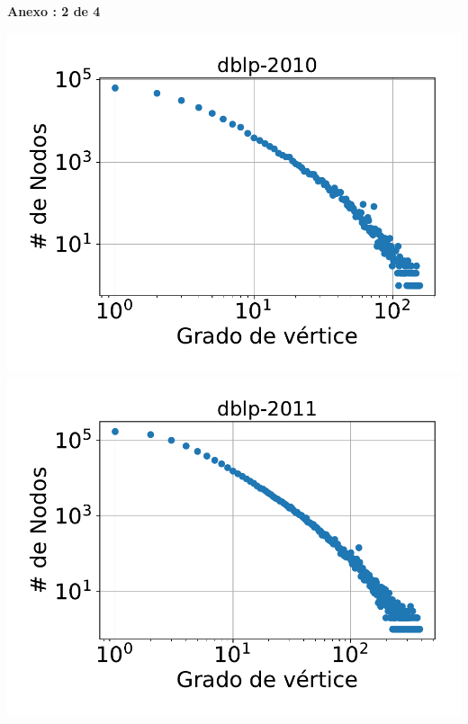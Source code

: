 \newpage
\centering
\textbf{Anexo \thechapter:  2 de 4}
\begin{minipage}{1\textwidth}
    \centering
    \includegraphics[width=.9\linewidth]{img/grades/dblp-2010.pdf} \\
    \includegraphics[width=.9\linewidth]{img/grades/dblp-2011.pdf} \\
\end{minipage}

